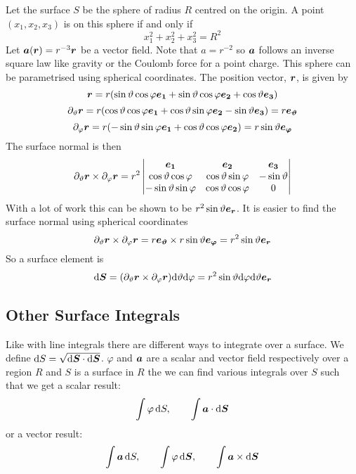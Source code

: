 \documentclass{article}
\begin{document}
    \example
    Let the surface \(S\) be the sphere of radius \(R\) centred on the origin.
    A point \((x_1, x_2, x_3)\) is on this sphere if and only if
    \[x_1^2 + x_2^2 + x_3^2 = R^2\]
    Let \(\bm{a}(\bm{r}) = r^{-3}\bm{r}\) be a vector field.
    Note that \(a = r^{-2}\) so \(\bm{a}\) follows an inverse square law like gravity or the Coulomb force for a point charge.
    This sphere can be parametrised using spherical coordinates.
    The position vector, \(\bm{r}\), is given by
    \[\bm{r} = r(\sin\vartheta\cos\varphi\bm{e_{1}} + \sin\vartheta\cos\varphi\bm{e_{2}} + \cos\vartheta\bm{e_{3}})\]
    \[\partial_\vartheta\bm{r} = r(\cos\vartheta\cos\varphi\bm{e_{1}} + \cos\vartheta\sin\varphi\bm{e_{2}} - \sin\vartheta\bm{e_{3}}) = r\bm{e_{\vartheta}}\]
    \[\partial_\varphi\bm{r} = r(-\sin\vartheta\sin\varphi\bm{e_{1}} + \cos\vartheta\cos\varphi\bm{e_{2}}) = r\sin\vartheta\bm{e_{\varphi}}\]
    The surface normal is then
    \[
        \partial_\vartheta\bm{r}\times\partial_\varphi\bm{r} = r^2
        \begin{vmatrix}
            \bm{e_{1}} & \bm{e_{2}} & \bm{e_{3}}\\
            \cos\vartheta\cos\varphi & \cos\vartheta\sin\varphi & -\sin\vartheta\\
            -\sin\vartheta\sin\varphi & \cos\vartheta\cos\varphi & 0
        \end{vmatrix}
    \]
    With a lot of work this can be shown to be \(r^2\sin\vartheta\bm{e_{r}}\).
    It is easier to find the surface normal using spherical coordinates
    \[\partial_\vartheta\bm{r}\times\partial_\varphi\bm{r} = r\bm{e_{\vartheta}}\times r\sin\vartheta\bm{e_{\varphi}} = r^2\sin\vartheta\bm{e_{r}}\]
    So a surface element is
    \[\dd \bm{S} = (\partial_\vartheta\bm{r}\times\partial_\varphi\bm{r})\dd\vartheta\dd\varphi = r^2\sin\vartheta\dd\varphi\dd\vartheta\bm{e_{r}}\]
    
    \subsection{Other Surface Integrals}
    Like with line integrals there are different ways to integrate over a surface.
    We define \(\dd S = \sqrt{\dd \bm{S}\cdot\dd\bm{S}}\).
    \(\varphi\) and \(\bm{a}\) are a scalar and vector field respectively over a region \(R\) and \(S\) is a surface in \(R\) the we can find various integrals over \(S\) such that we get a scalar result:
    \[\int\varphi\,\dd S,\qquad \int\bm{a}\cdot\dd\bm{S}\]
    or a vector result:
    \[\int\bm{a}\,\dd S,\qquad \int\varphi\,\dd\bm{S},\qquad \int\bm{a}\times\dd\bm{S}\]
    
\end{document}
